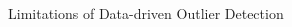 \documentclass[aspectratio=169]{beamer}
\begin{document}
\begin{frame}{Limitations of Data-driven Outlier Detection}
\begin{columns}
\begin{column}{0.38\textwidth}
{            }
\end{column}
\end{columns}
\end{frame}
\end{document}
